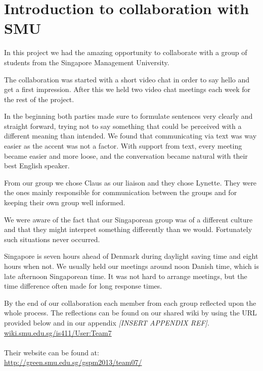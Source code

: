 \section{Introduction to collaboration with SMU}
In this project we had the amazing opportunity to collaborate with a group of students from the Singapore Management University.

The collaboration was started with a short video chat in order to say hello and get a first impression. After this we held two video chat meetings each week for the rest of the project.

In the beginning both parties made sure to formulate sentences very clearly and straight forward, trying not to say something that could be perceived with a different meaning than intended. We found that communicating via text was way easier as the accent was not a factor.
With support from text, every meeting became easier and more loose, and the conversation became natural with their best English speaker.

From our group we chose Claus as our liaison and they chose Lynette. They were the ones mainly responsible for communication between the groups and for keeping their own group well informed.

We were aware of the fact that our Singaporean group was of a different culture and that they might interpret something differently than we would. Fortunately such situations never occurred.

Singapore is seven hours ahead of Denmark during daylight saving time and eight hours when not. We usually held our meetings around noon Danish time, which is late afternoon Singaporean time. It was not hard to arrange meetings, but the time difference often made for long response times.

By the end of our collaboration each member from each group reflected upon the whole process. The reflections can be found on our shared wiki by using the URL provided below and in our appendix \textit{[INSERT APPENDIX REF]}.
\\\url{wiki.smu.edu.sg/is411/User:Team7}\\\\

Their website can be found at:
\\\url{http://green.smu.edu.sg/gspm2013/team07/}
\newpage